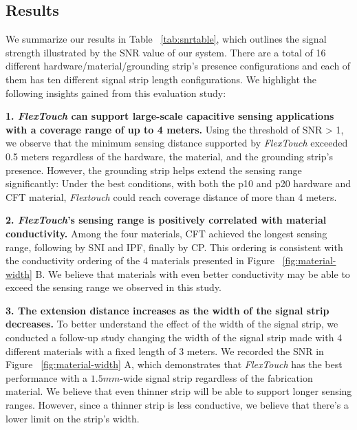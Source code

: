 \begin{table}[ht]
	\label{tab:snrtable}
	
\end{table}

\subsection{Results}

We summarize our results in Table ~\ref{tab:snrtable}, which outlines the signal strength illustrated by the SNR value of our system. There are a total of 16 different hardware/material/grounding strip's presence configurations and each of them has ten different signal strip length configurations. We highlight the following insights gained from this evaluation study:

\textbf{1. \textit{FlexTouch} can support large-scale capacitive sensing applications with a coverage range of up to 4 meters.}  Using the  threshold of SNR > 1, we observe that the minimum sensing distance supported by \textit{FlexTouch} exceeded 0.5 meters regardless of the hardware, the material, and the grounding strip's presence. However, the grounding strip helps extend the sensing range significantly: Under the best conditions, with both the p10 and p20 hardware and CFT material, \textit{Flextouch} could reach coverage distance of more than 4 meters.

\textbf{2. \textit{FlexTouch}'s sensing range is positively correlated with material conductivity.} Among the four materials, CFT achieved the longest sensing range, following by SNI and IPF, finally by CP. This ordering is consistent with the conductivity ordering of the 4 materials presented in Figure ~\ref{fig:material-width} B. We believe that materials with even better conductivity may be able to exceed the sensing range we observed in this study. 



\textbf{3. The extension distance increases as the width of the signal strip decreases.} To better understand the effect of the width of the signal strip, we conducted a follow-up study changing the width of the signal strip made with 4 different materials with a fixed length of 3 meters. We recorded the SNR in Figure ~\ref{fig:material-width} A, which demonstrates that \textit{FlexTouch} has the best performance with a $1.5mm$-wide signal strip regardless of the fabrication material. We believe that even thinner strip will be able to support longer sensing ranges. However, since a thinner strip is less conductive, we believe that there's a lower limit on the strip's width.



